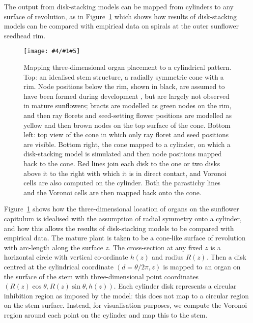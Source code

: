 \documentclass[a4paper,10pt]{amsart}
\newlength{\jfigwidth}
\newcommand{\pdffig}[3]{\jdofig{#1}{#2}{#3}{Figures}{.pdf}}
\newcommand{\jdofig}[5]{
	\begin{figure}\centering\texttt{[image: \#4/\#1\#5]} \caption{#2}\label{fig:#1}\end{figure}
}
\begin{document}
The output from disk-stacking models can be mapped from cylinders to any surface of revolution, as in Figure~\ref{fig:scpConeTransformation} which shows how  results of disk-stacking models can be compared with empirical data on spirals at the outer sunflower seedhead rim. 
%
\pdffig{scpConeTransformation}{Mapping three-dimensional organ placement to a cylindrical pattern. Top: an idealised stem structure, 
	a radially symmetric cone with a rim. Node positions below the rim, shown in black, are assumed to have been formed during development , but are largely not observed in mature sunflowers; bracts are modelled as green nodes on the rim, and then ray florets and seed-setting flower positions are  modelled as yellow and then brown nodes on the top surface of the cone. Bottom left: top view of the cone in which only ray floret and seed positions are visible. Bottom right, the cone mapped to a cylinder, on which a disk-stacking model is simulated and then node positions mapped back to the cone. 
	Red lines join each disk to the one or two disks above it to the right with which it is in direct contact, and Voronoi cells are also computed on the cylinder. Both the parastichy lines and the Voronoi cells are then mapped back onto the cone.}{1}
%
Figure~\ref{fig:scpConeTransformation} shows how the three-dimensional location of organs on the sunflower capitulum is idealised with the assumption of radial symmetry onto a cylinder, and how this allows the results of disk-stacking models to be compared with empirical data. The mature plant is taken to be a cone-like surface of revolution with arc-length along the surface $z$. The cross-section at any fixed $z$ is a horizontal circle with vertical co-ordinate $h(z)$ and radius $R(z)$.
Then a disk centred at  the cylindrical coordinate $(d=\theta/2\pi,z)$ is mapped to an organ on the surface of the stem with three-dimensional point coordinates $(R(z) \cos\theta,R(z)\sin\theta,h(z))$. Each cylinder disk represents a circular inhibition region as imposed by the model: this does not map to a circular region on the stem surface. Instead, for visualisation purposes, we compute the Voronoi region around each point on the cylinder and map this to the stem.
\end{document}

